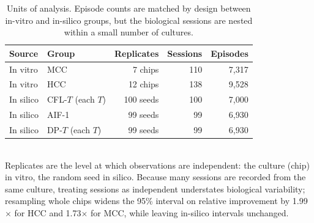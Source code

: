 \begin{table}[ht]
\centering
\caption{Units of analysis. Episode counts are matched by design between in-vitro and in-silico groups, but the biological sessions are nested within a small number of cultures.}
\label{tab:units}
\begin{tabular}{llrrr}
\toprule
Source & Group & Replicates & Sessions & Episodes \\
\midrule
In vitro & MCC & 7 chips & 110 & 7,317 \\
In vitro & HCC & 12 chips & 138 & 9,528 \\
In silico & CFL-$T$ (each $T$) & 100 seeds & 100 & 7,000 \\
In silico & AIF-1 & 99 seeds & 99 & 6,930 \\
In silico & DP-$T$ (each $T$) & 99 seeds & 99 & 6,930 \\
\bottomrule
\end{tabular}
\\[4pt]\footnotesize{Replicates are the level at which observations are independent: the culture (chip) in vitro, the random seed in silico. Because many sessions are recorded from the same culture, treating sessions as independent understates biological variability; resampling whole chips widens the 95\% interval on relative improvement by 1.99$\times$ for HCC and 1.73$\times$ for MCC, while leaving in-silico intervals unchanged.}
\end{table}
